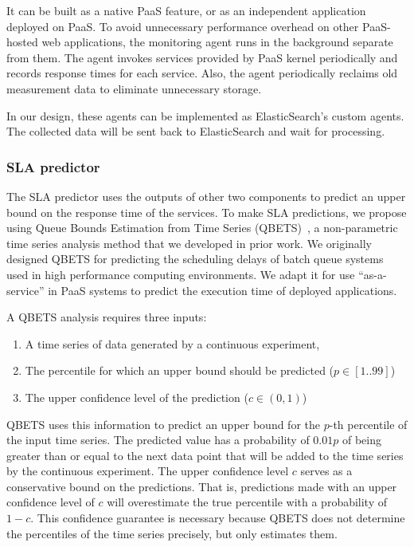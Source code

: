 \documentclass[11pt]{article}
\begin{document}
It can be built as a native PaaS feature, or as an independent application deployed on PaaS. To avoid unnecessary
performance overhead on other PaaS-hosted web applications, the monitoring agent runs in the background separate from them.
The agent invokes services provided by PaaS kernel periodically and records response times for each service. Also, the agent periodically
reclaims old measurement data to eliminate unnecessary storage.

In our design, these agents can be implemented as ElasticSearch's custom agents. The collected data will be sent back to ElasticSearch
and wait for processing.

\subsubsection{SLA predictor}
The SLA predictor uses the outputs of other two components to predict an upper bound 
on the response time of the services.
To make SLA predictions, we propose using Queue Bounds Estimation from Time Series 
(QBETS)~\cite{Nurmi:2007:QQB:1791551.1791556}, 
a non-parametric time series analysis method that we developed in prior work. 
We originally designed QBETS for
predicting the scheduling delays of batch queue systems 
used in high performance computing environments. 
We adapt it for use ``as-a-service'' in PaaS systems 
to predict the execution time of deployed applications.

A QBETS analysis requires three inputs:
\begin{enumerate}
\item A time series of data generated by a continuous experiment,
\item The percentile for which an upper bound should be predicted ($p \in [1..99]$)
\item The upper confidence level of the prediction ($c \in (0,1)$)
\end{enumerate}

QBETS uses this information to predict an upper bound for 
the $p$-th percentile of the input time series.
The predicted value has a probability of $0.01p$ of 
being greater than or equal to the next data point that
will be added to the time series by the continuous experiment. 
The upper confidence level $c$ serves as a conservative
bound on the predictions. That is, predictions made with an upper confidence 
level of $c$ will overestimate
the true percentile with a probability of $1-c$. This confidence guarantee 
is necessary because 
QBETS does not determine the 
percentiles of the time series precisely, but only estimates them.
\end{document}
